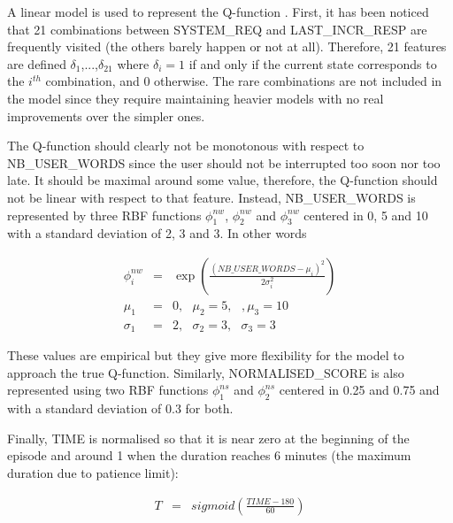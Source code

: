         A linear model is used to represent the Q-function \cite{Sutton1998}. First, it has been noticed that 21 combinations between SYSTEM\_REQ and LAST\_INCR\_RESP are frequently visited (the others barely happen or not at all). Therefore, 21 features are defined $\delta_1$,...,$\delta_{21}$ where $\delta_i = 1$ if and only if the current state corresponds to the $i^{th}$ combination, and 0 otherwise. The rare combinations are not included in the model since they require maintaining heavier models with no real improvements over the simpler ones.
        
        The Q-function should clearly not be monotonous with respect to NB\_USER\_WORDS since the user should not be interrupted too soon nor too late. It should be maximal around some value, therefore, the Q-function should not be linear with respect to that feature. Instead, NB\_USER\_WORDS is represented by three RBF functions $\phi^{nw}_1$, $\phi^{nw}_2$ and $\phi^{nw}_3$ centered in 0, 5 and 10 with a standard deviation of 2, 3 and 3. In other words
        
				\begin{eqnarray}
					\phi^{nw}_i & = & \exp \left( \frac{(NB\_USER\_WORDS - \mu_i)^2}{2 \sigma_i^2} \right) \\
          \mu_1 & = & 0, \text{ } \mu_2 = 5, \text{ }, \mu_3 = 10 \nonumber \\
          \sigma_1 & = & 2, \text{ } \sigma_2 = 3, \text{ } \sigma_3 = 3 \nonumber
				\end{eqnarray}
            
      	These values are empirical but they give more flexibility for the model to approach the true Q-function. Similarly, NORMALISED\_SCORE is also represented using two RBF functions $\phi^{ns}_1$ and $\phi^{ns}_2$ centered in 0.25 and 0.75 and with a standard deviation of 0.3 for both.
        
        Finally, TIME is normalised so that it is near zero at the beginning of the episode and around 1 when the duration reaches 6 minutes (the maximum duration due to patience limit):
        
				\begin{eqnarray}
					T & = & sigmoid \left( \frac{TIME-180}{60} \right)
				\end{eqnarray}
            
